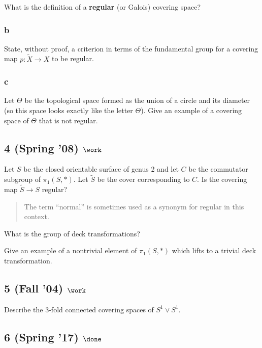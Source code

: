 What is the definition of a \textbf{regular} (or Galois) covering space?

\hypertarget{b-15}{%
\subsubsection{b}\label{b-15}}

State, without proof, a criterion in terms of the fundamental group for
a covering map \(p : \tilde X \to X\) to be regular.

\hypertarget{c-4}{%
\subsubsection{c}\label{c-4}}

Let \(\Theta\) be the topological space formed as the union of a circle
and its diameter (so this space looks exactly like the letter
\(\Theta\)). Give an example of a covering space of \(\Theta\) that is
not regular.

\hypertarget{spring-08-work-1}{%
\subsection{\texorpdfstring{4 (Spring '08)
\(\work\)}{4 (Spring '08) \textbackslash work}}\label{spring-08-work-1}}

Let \(S\) be the closed orientable surface of genus 2 and let \(C\) be
the commutator subgroup of \(\pi_1 (S, \ast)\). Let \(\tilde S\) be the
cover corresponding to \(C\). Is the covering map \(\tilde S \to S\)
regular?

\begin{quote}
The term ``normal'' is sometimes used as a synonym for regular in this
context.
\end{quote}

What is the group of deck transformations?

Give an example of a nontrivial element of \(\pi_1 (S, \ast)\) which
lifts to a trivial deck transformation.

\hypertarget{fall-04-work-2}{%
\subsection{\texorpdfstring{5 (Fall '04)
\(\work\)}{5 (Fall '04) \textbackslash work}}\label{fall-04-work-2}}

Describe the 3-fold connected covering spaces of \(S^1 \lor S^1\).

\hypertarget{spring-17-done}{%
\subsection{\texorpdfstring{6 (Spring '17)
\(\done\)}{6 (Spring '17) \textbackslash done}}\label{spring-17-done}}

